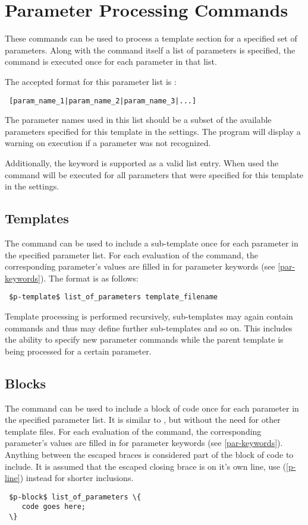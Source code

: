 \documentclass{settings/TU_Delft_Report}
\begin{document}
\section{Parameter Processing Commands} \label{p-commands}
These commands can be used to process a template section for a specified set of parameters. Along with the command itself a list of parameters is specified, the command is executed once for each parameter in that list. 

\vsp The accepted format for this parameter list is :
\begin{lstlisting}
 [param_name_1|param_name_2|param_name_3|...]
\end{lstlisting}

The parameter names used in this list should be a subset of the available parameters specified for this template in the settings. The program will display a warning on execution if a parameter was not recognized.

Additionally, the keyword  is supported as a valid list entry. When used the command will be executed for all parameters that were specified for this template in the settings.

\subsection{Templates} \label{p-template}
The  command can be used to include a sub-template once for each parameter in the specified parameter list. For each evaluation of the command, the corresponding parameter's values are filled in for parameter keywords (see \ref{par-keywords}). The format is as follows:
\begin{lstlisting}
 $p-template$ list_of_parameters template_filename
\end{lstlisting}

Template processing is performed recursively, sub-templates may again contain commands and thus may define further sub-templates and so on. This includes the ability to specify new parameter commands while the parent template is being processed for a certain parameter.

\subsection{Blocks} \label{p-block}
The  command can be used to include a block of code once for each parameter in the specified parameter list. It is similar to , but without the need for other template files. For each evaluation of the command, the corresponding parameter's values are filled in for parameter keywords (see \ref{par-keywords}). Anything between the escaped braces is considered part of the block of code to include. It is assumed that the escaped closing brace is on it's own line, use  (\ref{p-line}) instead for shorter inclusions.
\begin{lstlisting}
 $p-block$ list_of_parameters \{ 
    code goes here;
 \}
\end{lstlisting}
\end{document}

